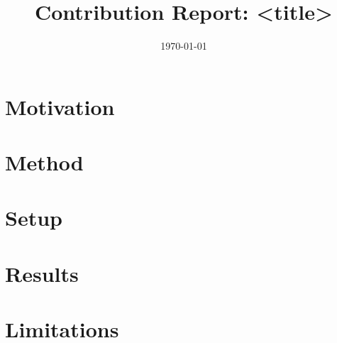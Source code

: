 \documentclass[11pt,a4paper]{article}
\title{Contribution Report: <title>}
\author{}
\date{\today}
\begin{document}
\maketitle
\tableofcontents

\section{Motivation}

\section{Method}

\section{Setup}

\section{Results}

\section{Limitations}

\printbibliography
\end{document}
